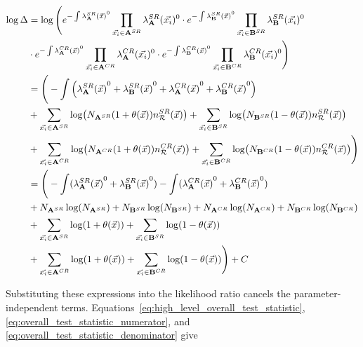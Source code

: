 \documentclass[paper/ddppaper2.tex]{subfiles}
\begin{document}
\begin{wideequations}
\begin{equation}
\label{eq:overall_test_statistic_denominator}
\begin{aligned}
\log \Delta &= \log \Bigg(
    e^{- \int \srdist{\dataset{A}}^0} \prod\limits_{\event \in \srdataset{A}} \srdistevent{\dataset{A}}^0
    \cdot
    e^{- \int \srdist{\dataset{B}}^0} \prod\limits_{\event \in \srdataset{B}} \srdistevent{\dataset{B}}^0 \\&
    \cdot
    e^{- \int \crdist{\dataset{A}}^0} \prod\limits_{\event \in \crdataset{A}} \crdistevent{\dataset{A}}^0
    \cdot
    e^{- \int \crdist{\dataset{B}}^0} \prod\limits_{\event \in \crdataset{B}} \crdistevent{\dataset{B}}^0
\Bigg)
\\&
= \Bigg(
    - \int \left(
        \srdist{\dataset{A}}^0
        + \srdist{\dataset{B}}^0
        + \crdist{\dataset{A}}^0
        + \crdist{\dataset{B}}^0
    \right)
    \\&
    + \sum\limits_{\event \in \srdataset{A}} \log({N_\srdataset{A}} (1 + {\nparam(\anyevent)}) \srrefdist)
    + \sum\limits_{\event \in \srdataset{B}} \log({N_\srdataset{B}} (1 - {\nparam(\anyevent)}) \srrefdist) \\&
    + \sum\limits_{\event \in \crdataset{A}} \log({N_\crdataset{A}} (1 + {\nparam(\anyevent)}) \crrefdist)
    + \sum\limits_{\event \in \crdataset{B}} \log({N_\crdataset{B}} (1 - {\nparam(\anyevent)}) \crrefdist)
\Bigg)
\\&
= \Bigg(
    - \int (\srdist{\dataset{A}}^0 + \srdist{\dataset{B}}^0)
    - \int (\crdist{\dataset{A}}^0 + \crdist{\dataset{B}}^0)
    \\&
    + N_{\srdataset{A}}\log({N_\srdataset{A}})
    + N_{\srdataset{B}}\log({N_\srdataset{B}})
    + N_{\crdataset{A}}\log({N_\crdataset{A}})
    + N_{\crdataset{B}}\log({N_\crdataset{B}})
    \\&
    + \sum\limits_{\event \in \srdataset{A}} \log(1 + {\nparam(\anyevent)})
    + \sum\limits_{\event \in \srdataset{B}} \log(1 - {\nparam(\anyevent)}) \\&
    + \sum\limits_{\event \in \crdataset{A}} \log(1 + {\nparam(\anyevent)})
    + \sum\limits_{\event \in \crdataset{B}} \log(1 - {\nparam(\anyevent)})
\Bigg) + C
\end{aligned}
\end{equation}
\end{wideequations}

Substituting these expressions into the likelihood ratio cancels the parameter-independent terms. Equations~\ref{eq:high_level_overall_test_statistic}, \ref{eq:overall_test_statistic_numerator}, and \ref{eq:overall_test_statistic_denominator} give
\end{document}
